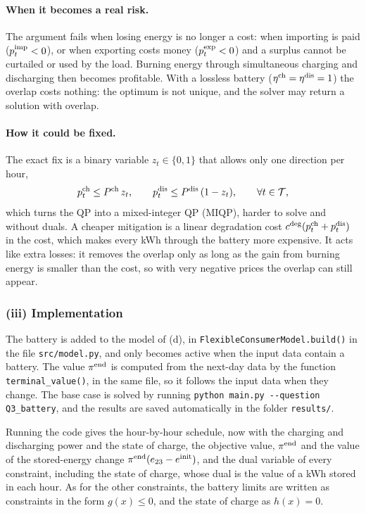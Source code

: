 \paragraph{When it becomes a real risk.}
The argument fails when losing energy is no longer a cost: when importing is paid
($\pimp < 0$), or when exporting costs money ($\pexp < 0$) and a surplus cannot be curtailed
or used by the load. Burning energy through simultaneous charging and discharging then
becomes profitable. With a lossless battery
($\etach = \etadis = 1$) the overlap costs nothing: the optimum is not unique, and the solver
may return a solution with overlap.

\paragraph{How it could be fixed.}
The exact fix is a binary variable $z_t \in \{0, 1\}$ that allows only one direction per hour,
\begin{equation}
    \pch \leq \Pch \, z_t, \qquad \pdis \leq \Pdis \, (1 - z_t), \qquad \forall t \in \T,
\end{equation}
which turns the QP into a mixed-integer QP (MIQP), harder to solve and without duals. A
cheaper mitigation is a linear degradation cost $c^{\mathrm{deg}} (\pch + \pdis)$ in the
cost, which makes every kWh through the battery more expensive. It acts like extra losses: it
removes the overlap only as long as the gain from burning energy is smaller than the cost, so
with very negative prices the overlap can still appear.

\subsubsection{(iii) Implementation}
The battery is added to the model of (d), in \texttt{FlexibleConsumerModel.build()} in the file
\texttt{src/model.py}, and only becomes active when the input data contain a battery. The value
$\piend$ is computed from the next-day data by the function \texttt{terminal\_value()}, in the
same file, so it follows the input data when they change. The base case is solved by running
\texttt{python main.py -{}-question Q3\_battery}, and the results are saved automatically in the
folder \texttt{results/}.

Running the code gives the hour-by-hour schedule, now with the charging and discharging power
and the state of charge, the objective value, $\piend$ and the value of the stored-energy change
$\piend(\soc[23] - \einit)$, and the dual variable of every constraint, including the state of
charge, whose dual is the value of a kWh stored in each hour. As for the other constraints,
the battery limits are written as constraints in the form $g(x) \leq 0$, and the state of
charge as $h(x) = 0$.

